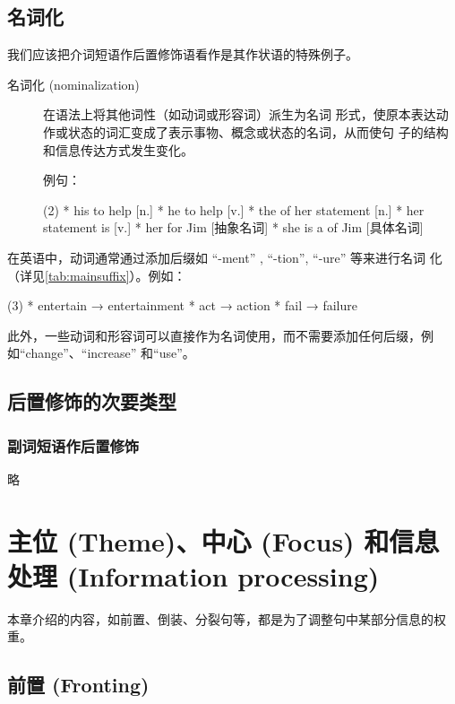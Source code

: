 \section{名词化}

我们应该把介词短语作后置修饰语看作是其作状语的特殊例子。

\begin{description}
\item[名词化 (nominalization)] 在语法上将其他词性（如动词或形容词）派生为名词
  形式，使原本表达动作或状态的词汇变成了表示事物、概念或状态的名词，从而使句
  子的结构和信息传达方式发生变化。


  例句：
  \begin{taskitem}(2)
    * his  to help [n.]
    * he  to help [v.]
    * the  of her statement [n.]
    * her statement is   [v.]
    * her  for Jim [抽象名词]
    * she is a  of Jim [具体名词]
  \end{taskitem}
\end{description}

在英语中，动词通常通过添加后缀如 ``-ment'' , ``-tion'', ``-ure'' 等来进行名词
化（详见\cref{tab:mainsuffix}）。例如：
\begin{taskitem}(3)
* entertain → entertainment
* act → action
* fail → failure
\end{taskitem}
此外，一些动词和形容词可以直接作为名词使用，而不需要添加任何后缀，例
如``change''、``increase'' 和``use''。

\section{后置修饰的次要类型}

\subsection{副词短语作后置修饰}

略



\chapter{主位 (Theme)、中心 (Focus) 和信息处理 (Information processing)}

本章介绍的内容，如前置、倒装、分裂句等，都是为了调整句中某部分信息的权重。

\section{前置 (Fronting)}


